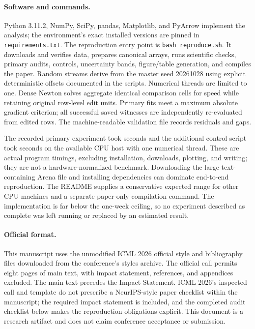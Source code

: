 \documentclass{article}
\begin{document}
\paragraph{Software and commands.}
Python 3.11.2, NumPy, SciPy, pandas, Matplotlib, and PyArrow implement the analysis; the environment's exact installed versions are pinned in \texttt{requirements.txt}. The reproduction entry point is \texttt{bash reproduce.sh}. It downloads and verifies data, prepares canonical arrays, runs scientific checks, primary audits, controls, uncertainty bands, figure/table generation, and compiles the paper. Random streams derive from the master seed 20261028 using explicit deterministic offsets documented in the scripts. Numerical threads are limited to one. Dense Newton solves aggregate identical comparison cells for speed while retaining original row-level edit units. Primary fits meet a maximum absolute gradient criterion; all successful saved witnesses are independently re-evaluated from edited rows. The machine-readable validation file records residuals and gaps.

The recorded primary experiment took \PrimarySeconds{} seconds and the additional control script took \ControlSeconds{} seconds on the available CPU host with one numerical thread. These are actual program timings, excluding installation, downloads, plotting, and writing; they are not a hardware-normalized benchmark. Downloading the large text-containing Arena file and installing dependencies can dominate end-to-end reproduction. The README supplies a conservative expected range for other CPU machines and a separate paper-only compilation command. The implementation is far below the one-week ceiling, so no experiment described as complete was left running or replaced by an estimated result.

\paragraph{Official format.}
This manuscript uses the unmodified ICML 2026 official style and bibliography files downloaded from the conference's styles archive. The official call permits eight pages of main text, with impact statement, references, and appendices excluded. The main text precedes the Impact Statement. ICML 2026's inspected call and template do not prescribe a NeurIPS-style paper checklist within the manuscript; the required impact statement is included, and the completed audit checklist below makes the reproduction obligations explicit. This document is a research artifact and does not claim conference acceptance or submission.
\end{document}
